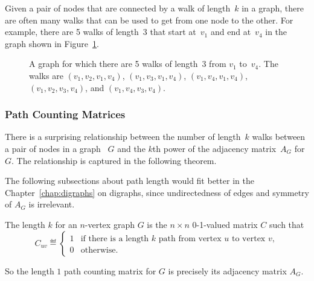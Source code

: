 Given a pair of nodes that are connected by a walk of length~$k$ in a
graph, there are often many walks that can be used to get from one
node to the other.  For example, there are 5 walks of length~3 that
start at~$v_1$ and end at~$v_4$ in the graph shown in
Figure~\ref{fig:5AD}.

\begin{figure}


\caption{A graph for which there are 5 walks of length~3 from $v_1$
  to~$v_4$.  The walks are $(v_1, v_2, v_1, v_4)$, $(v_1, v_3, v_1,
  v_4)$, $(v_1, v_4, v_1, v_4)$, $(v_1, v_2, v_3, v_4)$, and $(v_1,
  v_4, v_3, v_4)$.}
\label{fig:5AD}
\end{figure}

\subsubsection{Path Counting Matrices}

There is a surprising relationship between the number of length~$k$
walks between a pair of nodes in a graph ~$G$  and the $k$th power of
the adjacency matrix~$A_G$ for~$G$.  The relationship is captured in the
following theorem.
\begin{editingnotes}
   The following subsections about path length would
  fit better in the Chapter~\ref{chap:digraphs} on digraphs, since
  undirectedness of edges and symmetry of $A_G$ is irrelevant.
\end{editingnotes}

\begin{editingnotes}
\end{editingnotes}

\begin{definition}
  The length $k$  for an $n$-vertex graph $G$
  is the $n \times n$ 0-1-valued matrix $C$ such that
\begin{equation}\label{def:path_matrix}
C_{uv} \eqdef
\begin{cases} 1 & \text{if there is a length $k$ path from vertex
                     $u$ to vertex $v$},\\
              0 & \text{otherwise}.
\end{cases}
\end{equation}
\end{definition}

So the length $1$ path counting matrix for $G$ is precisely its adjacency matrix
$A_G$.

